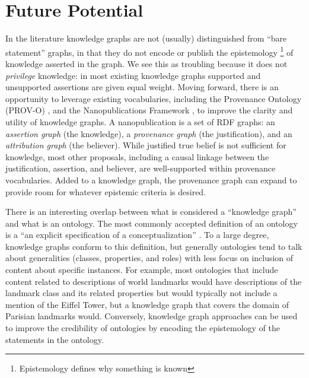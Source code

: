 \section{Future Potential}

In the literature knowledge graphs are not (usually) distinguished from ``bare statement'' graphs, in that they do not encode or publish the epistemology \footnote{Epistemology defines why something is known} of knowledge asserted in the graph.
We see this as troubling because it does not {\em privilege} knowledge: in most existing knowledge graphs supported and unsupported assertions are given equal weight.
Moving forward, there is an opportunity to leverage existing vocabularies, including the Provenance Ontology (PROV-O) \cite{Moreau_2015}, and the Nanopublications Framework \cite{groth2010anatomy}, to improve the clarity and utility of knowledge graphs.
A nanopublication is a set of RDF graphs: an {\em assertion graph} (the knowledge), a {\em provenance graph} (the justification), and an {\em attribution graph} (the believer).
While justified true belief is not sufficient for knowledge, most other proposals, including a causal linkage between the justification, assertion, and believer, are well-supported within provenance vocabularies.
Added to a knowledge graph, the provenance graph can expand to provide room for whatever epistemic criteria is desired.

There is an interesting overlap between what is considered a ``knowledge graph'' and what is an ontology.
The most commonly accepted definition of an ontology is a ``an explicit specification of a conceptualization'' \cite{Gruber_1993}.
To a large degree, knowledge graphs conform to this definition, but generally ontologies tend to talk about generalities (classes, properties, and roles) with less focus on inclusion of content about specific instances.
For example, most ontologies that include content related to descriptions of world landmarks would have descriptions of the landmark class and its related properties but would typically not include a mention of the Eiffel Tower, but a knowledge graph that covers the domain of Parisian landmarks would.
Conversely, knowledge graph approaches can be used to improve the credibility of ontologies by encoding the epistemology of the statements in the ontology.
